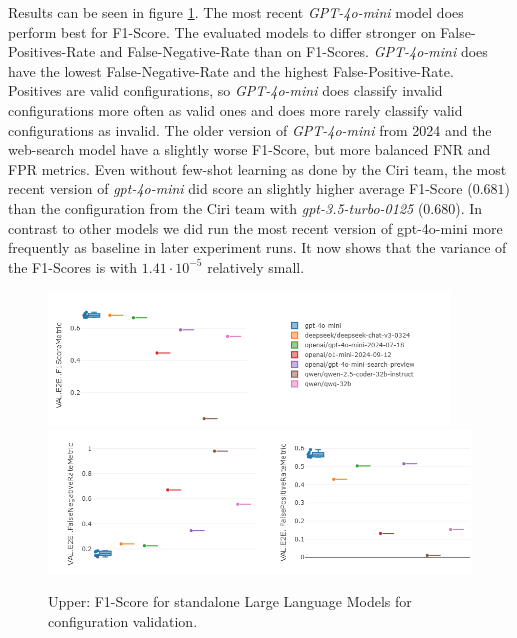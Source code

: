 Results can be seen in figure \ref{fig:LLMStandalone-Results}. The most recent \textit{GPT-4o-mini} model does perform best for F1-Score. The evaluated models to differ stronger on False-Positives-Rate and False-Negative-Rate than on F1-Scores. \textit{GPT-4o-mini} does have the lowest False-Negative-Rate and the highest False-Positive-Rate. Positives are valid configurations, so \textit{GPT-4o-mini} does classify invalid configurations more often as valid ones and does more rarely classify valid configurations as invalid. The older version of \textit{GPT-4o-mini} from 2024 and the web-search model have a slightly worse F1-Score, but more balanced FNR and FPR metrics. Even without few-shot learning as done by the Ciri team, the most recent version of \textit{gpt-4o-mini} did score an slightly higher average F1-Score ($0.681$) than the configuration from the Ciri team with \textit{gpt-3.5-turbo-0125} ($0.680$). In contrast to other models we did run the most recent version of gpt-4o-mini more frequently as baseline in later experiment runs. It now shows that the variance of the F1-Scores is with $1.41 \cdot 10^{-5}$ relatively small. 


\begin{figure}[h]
    \centering
    \includegraphics[width=0.95\textwidth]{images/LLMStandalone-by-model.png}\\[6pt]
    \includegraphics[width=\textwidth]{images/LLMStandalone-by-model-FNRFPR.png}
    \caption{Upper: F1-Score for standalone Large Language Models for configuration validation. }
    \label{fig:LLMStandalone-Results}
  \end{figure}

